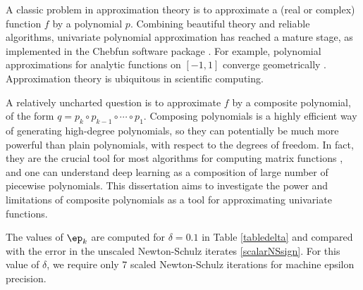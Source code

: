 A classic problem in approximation theory is to approximate a (real or complex) function $f$ by a polynomial $p$. Combining beautiful theory and reliable algorithms, univariate polynomial approximation has reached a mature stage, as implemented in the Chebfun software package \cite{chebfun}. For example, polynomial approximations for analytic functions on $[-1,1]$ converge geometrically \cite{ATAP}. Approximation theory is ubiquitous in scientific computing.

\bigskip{}

A relatively uncharted question is to approximate $f$ by a composite polynomial, of the form $q=p_k\circ p_{k-1} \circ\cdots \circ p_1$. Composing polynomials is a highly efficient way of generating high-degree polynomials, so they can potentially be much more powerful than plain polynomials, with respect to the degrees of freedom. In fact, they are the crucial tool for most algorithms for computing matrix functions \cite{Higham}, and one can understand deep learning as a composition of large number of piecewise polynomials. This dissertation aims to investigate the power and limitations of composite polynomials as a tool for approximating univariate functions.



The values of $\ep_k$ are computed for $\delta=0.1$ in Table \ref{tabledelta} and compared with the error in the unscaled Newton-Schulz iterates \eqref{scalarNSsign}. For this value of $\delta$, we require only 7 scaled Newton-Schulz iterations for machine epsilon precision.

